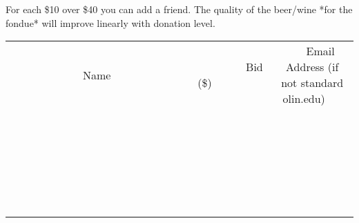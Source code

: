 \documentclass[11pt]{article}
\begin{document}
For each \$10 over \$40 you can add a friend.
The quality of the beer/wine *for the fondue* will improve linearly with donation level.
\\[6ex]
\begin{tabular}{c c c}
~~~~~~~~~~~~~Name~~~~~~~~~~~~~ & ~~~~~~~~~Bid (\$)~~~~~~~~~  & ~~~Email Address (if not standard olin.edu)~~~\\
 & & \\
\hline
 & & \\
\hline
 & & \\
\hline
 & & \\
\hline
 & & \\
\hline
 & & \\
\hline
 & & \\
\hline
 & & \\
\hline
 & & \\
\hline
 & & \\
\hline
 & & \\
\hline
 & & \\
\hline
 & & \\
\hline
 & & \\
\hline
 & & \\
\hline
 & & \\
\hline
 & & \\
\hline
 & & \\
\hline
 & & \\
\hline
 & & \\
\hline
 & & \\
\hline
 & & \\
\hline
 & & \\
\hline
 & & \\
\hline
 & & \\
\hline
 & & \\
\hline
\end{tabular}
\newpage
\end{document}
